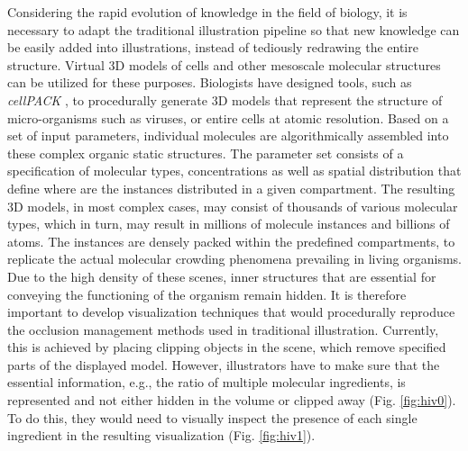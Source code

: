 Considering the rapid evolution of knowledge in the field of biology, it is necessary to adapt the traditional illustration pipeline so that new knowledge can be easily added into illustrations, instead of tediously redrawing the entire structure.
Virtual 3D models of cells and other mesoscale molecular structures can be utilized for these purposes.
Biologists have designed tools, such as \emph{cellPACK} \cite{cellpack}, to procedurally generate 3D models that represent the structure of micro-organisms such as viruses, or entire cells at atomic resolution.
Based on a set of input parameters, individual molecules are algorithmically assembled into these complex organic static structures. 
The parameter set consists of a specification of molecular types, concentrations as well as spatial distribution that define where are the instances distributed in a given compartment. 
The resulting 3D models, in most complex cases, may consist of thousands of various molecular types, which in turn, may result in millions of molecule instances and billions of atoms.
The instances are densely packed within the predefined compartments, to replicate the actual molecular crowding phenomena prevailing in living organisms.
Due to the high density of these scenes, inner structures that are essential for conveying the functioning of the organism remain hidden.
It is therefore important to develop visualization techniques that would procedurally reproduce the occlusion management methods used in traditional illustration.
Currently, this is achieved by placing clipping objects in the scene, which remove specified parts of the displayed model. 
However, illustrators have to make sure that the essential information, e.g., the ratio of multiple molecular ingredients, is represented and not either hidden in the volume or clipped away (Fig. \ref{fig:hiv0}). 
To do this, they would need to visually inspect the presence of each single ingredient in the resulting visualization (Fig. \ref{fig:hiv1}).

